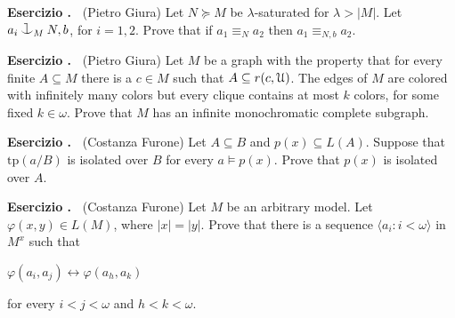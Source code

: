 \documentclass[10pt]{article}
\def\phi{\varphi}
\def\U{\EuScript U}
\def\iff{\leftrightarrow}
\def\tp{\textrm{tp}}
\def\cnonfork{\mathbin{\raise1.8ex\rlap{\kern0.6ex\rule{0.6ex}{0.1ex}}\rlap{\kern1.1ex\rule{0.1ex}{1.9ex}}\raise-0.3ex\hbox{$\smile$} } }
\newcounter{ex}
\newenvironment{exercise}{\bigskip\par\addtocounter{ex}{1}\textbf{Esercizio \theex.\ }}{}
\begin{document}
\begin{exercise}
  (Pietro Giura)
  Let $N\succeq M$ be $\lambda$-saturated for $\lambda>|M|$.
  Let $a_i\cnonfork_M N,b$, for $i=1,2$.
  Prove that if $a_1\equiv_N a_2$ then $a_1\equiv_{N,b} a_2$.
\end{exercise}
\begin{exercise}
  (Pietro Giura)
  Let $M$ be a graph with the property that for every finite $A\subseteq M$ there is a $c\in M$ such that $A\subseteq r(c,\U)$.
  The edges of $M$ are colored with infinitely many colors but every clique contains at most $k$ colors, for some fixed $k\in\omega$.
  Prove that $M$ has an infinite monochromatic complete subgraph.
\end{exercise}
\begin{exercise} 
  (Costanza Furone) 
  Let $A\subseteq B$ and $p(x)\subseteq L(A)$. 
  Suppose that $\tp(a/B)$ is isolated over $B$ for every $a\models p(x)$.
  Prove that $p(x)$ is isolated over $A$.
\end{exercise}
\begin{exercise} 
  (Costanza Furone) 
  Let $M$ be an arbitrary model.
  Let $\phi(x,y)\in L(M)$, where $|x|=|y|$.
  Prove that there is a sequence $\langle a_i:i<\omega\rangle$ in $M^{x}$ such that\vspace*{-1ex}

  \hfil$\phi(a_i,a_j)\iff\phi(a_h,a_k)$\vspace*{-1ex}

  for every $i<j<\omega$ and $h<k<\omega$.
\end{exercise}
\end{document}
